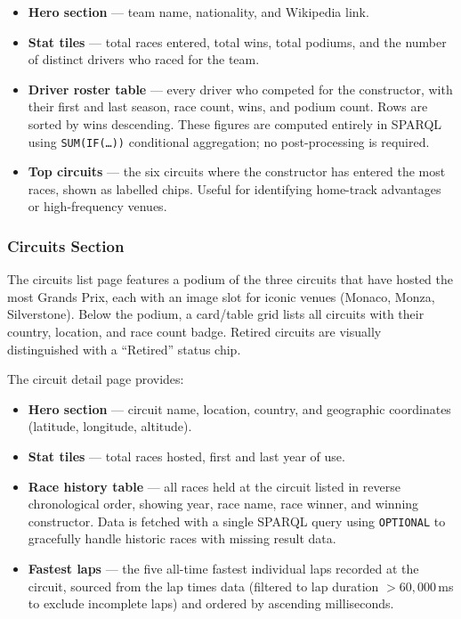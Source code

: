 \documentclass[12pt,a4paper]{article}
\begin{document}
\begin{itemize}[leftmargin=1.5em]
  \item \textbf{Hero section} --- team name, nationality, and Wikipedia link.
  \item \textbf{Stat tiles} --- total races entered, total wins, total podiums,
        and the number of distinct drivers who raced for the team.
  \item \textbf{Driver roster table} --- every driver who competed for the
        constructor, with their first and last season, race count, wins, and
        podium count. Rows are sorted by wins descending. These figures are
        computed entirely in SPARQL using \texttt{SUM(IF(\ldots))} conditional
        aggregation; no post-processing is required.
  \item \textbf{Top circuits} --- the six circuits where the constructor has
        entered the most races, shown as labelled chips. Useful for identifying
        home-track advantages or high-frequency venues.
\end{itemize}

\subsubsection{Circuits Section}

The circuits list page features a podium of the three circuits that have hosted
the most Grands Prix, each with an image slot for iconic venues (Monaco,
Monza, Silverstone). Below the podium, a card/table grid lists all circuits
with their country, location, and race count badge. Retired circuits are
visually distinguished with a ``Retired'' status chip.

The circuit detail page provides:

\begin{itemize}[leftmargin=1.5em]
  \item \textbf{Hero section} --- circuit name, location, country, and
        geographic coordinates (latitude, longitude, altitude).
  \item \textbf{Stat tiles} --- total races hosted, first and last year of use.
  \item \textbf{Race history table} --- all races held at the circuit listed
        in reverse chronological order, showing year, race name, race winner,
        and winning constructor. Data is fetched with a single SPARQL query
        using \texttt{OPTIONAL} to gracefully handle historic races with missing
        result data.
  \item \textbf{Fastest laps} --- the five all-time fastest individual laps
        recorded at the circuit, sourced from the lap times data
        (filtered to lap duration $> 60{,}000$\,ms to exclude incomplete
        laps) and ordered by ascending milliseconds.
\end{itemize}
\end{document}
